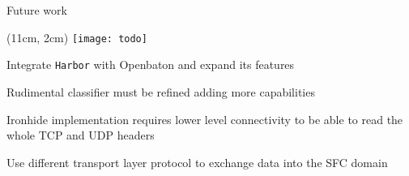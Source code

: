 \begin{frame}{Future work}

  \begin{textblock*}{1cm}(11cm, 2cm)
    \texttt{[image: todo]}
  \end{textblock*}

  Integrate \texttt{Harbor} with Openbaton and expand its features

  \vfill{}

  Rudimental classifier must be refined adding more capabilities

  \vfill{}

  Ironhide implementation requires lower level connectivity to be able to read
  the whole TCP and UDP headers

  \vfill{}

  Use different transport layer protocol to exchange data into the SFC domain

  \vfill{}

\end{frame}